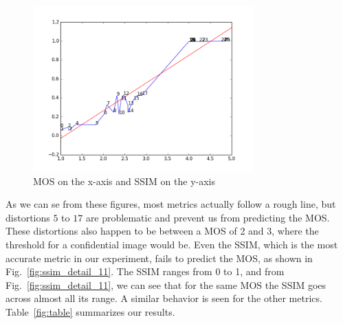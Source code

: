 \documentclass{article}
\begin{document}
\begin{figure}[ht]
  \centering
  \includegraphics[width=8.5cm]{figures/mos_ssim}
  \caption{MOS on the x-axis and SSIM on the y-axis\label{fig:ssim} }
  \vspace{-5mm}
\end{figure}

As we can se from these figures, most metrics actually follow a rough line, but distortions $5$ to $17$ are problematic and prevent us from predicting the MOS. These distortions also happen to be between a MOS of 2 and 3, where the threshold for a confidential image would be. Even the SSIM, which is the most accurate metric in our experiment, fails to predict the MOS, as shown in Fig.~\ref{fig:ssim_detail_11}. The SSIM ranges from 0 to 1, and from Fig.~\ref{fig:ssim_detail_11}, we can see that for the same MOS the SSIM goes across almost all its range. A similar behavior is seen for the other metrics. Table~\ref{fig:table} summarizes our results.
\end{document}
